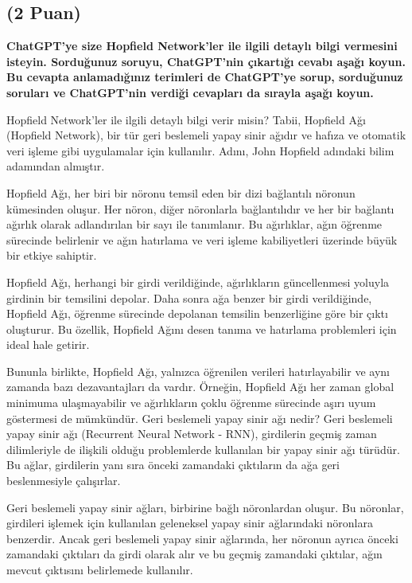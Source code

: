\documentclass[11pt]{article}
\begin{document}
\subsection{(2 Puan)} \textbf{ChatGPT’ye size Hopfield Network’ler ile ilgili detaylı bilgi vermesini isteyin. Sorduğunuz soruyu, ChatGPT'nin çıkartığı cevabı aşağı koyun. Bu cevapta anlamadığınız terimleri de ChatGPT’ye sorup, sorduğunuz soruları ve ChatGPT’nin verdiği cevapları da sırayla aşağı koyun.}
\newline
\begin{dialogue}
 Hopfield Network’ler ile ilgili detaylı bilgi verir misin?
 Tabii, Hopfield Ağı (Hopfield Network), bir tür geri beslemeli yapay sinir ağıdır ve hafıza ve otomatik veri işleme gibi uygulamalar için kullanılır. Adını, John Hopfield adındaki bilim adamından almıştır.

Hopfield Ağı, her biri bir nöronu temsil eden bir dizi bağlantılı nöronun kümesinden oluşur. Her nöron, diğer nöronlarla bağlantılıdır ve her bir bağlantı ağırlık olarak adlandırılan bir sayı ile tanımlanır. Bu ağırlıklar, ağın öğrenme sürecinde belirlenir ve ağın hatırlama ve veri işleme kabiliyetleri üzerinde büyük bir etkiye sahiptir.

Hopfield Ağı, herhangi bir girdi verildiğinde, ağırlıkların güncellenmesi yoluyla girdinin bir temsilini depolar. Daha sonra ağa benzer bir girdi verildiğinde, Hopfield Ağı, öğrenme sürecinde depolanan temsilin benzerliğine göre bir çıktı oluşturur. Bu özellik, Hopfield Ağını desen tanıma ve hatırlama problemleri için ideal hale getirir.

Bununla birlikte, Hopfield Ağı, yalnızca öğrenilen verileri hatırlayabilir ve aynı zamanda bazı dezavantajları da vardır. Örneğin, Hopfield Ağı her zaman global minimuma ulaşmayabilir ve ağırlıkların çoklu öğrenme sürecinde aşırı uyum göstermesi de mümkündür.
 Geri beslemeli yapay sinir ağı nedir?
 Geri beslemeli yapay sinir ağı (Recurrent Neural Network - RNN), girdilerin geçmiş zaman dilimleriyle de ilişkili olduğu problemlerde kullanılan bir yapay sinir ağı türüdür. Bu ağlar, girdilerin yanı sıra önceki zamandaki çıktıların da ağa geri beslenmesiyle çalışırlar.

Geri beslemeli yapay sinir ağları, birbirine bağlı nöronlardan oluşur. Bu nöronlar, girdileri işlemek için kullanılan geleneksel yapay sinir ağlarındaki nöronlara benzerdir. Ancak geri beslemeli yapay sinir ağlarında, her nöronun ayrıca önceki zamandaki çıktıları da girdi olarak alır ve bu geçmiş zamandaki çıktılar, ağın mevcut çıktısını belirlemede kullanılır.


\end{dialogue}
\end{document}
